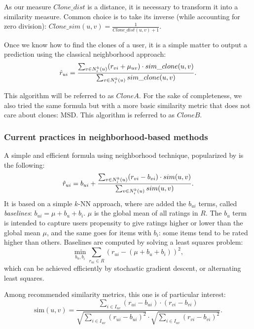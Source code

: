 As our measure $Clone\_dist$ is a distance, it is necessary to transform it
into a similarity measure. Common choice is to take its inverse (while accounting for zero division): $Clone\_sim(u,
v) = \frac{1}{Clone\_dist(u, v) + 1}$.

Once we know how to find the clones of a user, it is a simple matter to output
a prediction using the classical neighborhood approach:
$$\hat{r}_{ui} = \frac{\sum_{v \in N_i^k(u)} (r_{vi} + \mu_{uv}) \cdot sim\_clone(u,
v)}{\sum_{v \in N_i^k(u)} sim\_clone(u, v)}.$$

This algorithm will be referred to as $CloneA$. For the sake of completeness,
we also tried the same formula but with a more basic similarity metric that
does not care about clones: MSD. This algorithm is referred to as $CloneB$.

\subsubsection{Current practices in neighborhood-based methods}

A simple and efficient formula using neighborhood technique, popularized by
\cite{KorACM2010} is the following:
$$\hat{r}_{ui} = b_{ui} + \frac{\sum_{v \in N_i^k(u)} (r_{vi} - b_{vi}) \cdot
sim(u, v)} {\sum_{v \in N_i^k(u)}sim(u, v)}.$$
It is based on a simple $k$-NN approach, where are added the $b_{ui}$ terms,
called \textit{baselines}: $b_{ui} = \mu + b_u + b_i$. $\mu$ is the global mean
of all ratings in $R$. The $b_u$ term is intended to capture users propensity
to give ratings higher or lower than the global mean $\mu$, and the same goes
for items with $b_i$: some items tend to be rated higher than others. Baselines
are computed by solving a least squares problem:
$$ \min\limits_{b_u, b_i} \sum_{r_{ui} \in R} (r_{ui} - (\mu + b_u + b_i))^2,$$
which can be achieved efficiently by stochastic gradient descent, or
alternating least squares.

Among recommended similarity metrics, this one is of particular interest:
$$\text{sim}(u, v) = \frac
{ \sum\limits_{i \in I_{uv}} (r_{ui} -  b_{ui}) \cdot (r_{vi} - b_{vi})}
{\sqrt{\sum\limits_{i \in I_{uv}} (r_{ui} -  b_{ui})^2} \cdot
\sqrt{\sum\limits_{i \in I_{uv}} (r_{vi} -  b_{vi})^2}}.$$


